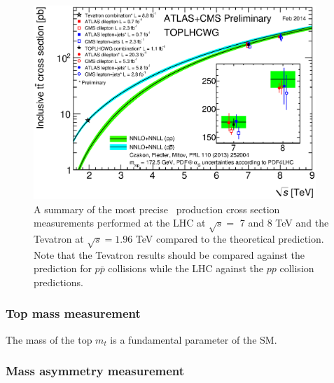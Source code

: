 \begin{figure}[htbp]
  \centering
  \includegraphics[width=0.95\textwidth]{PartTopQuark/Plots/tt_xsec_vsroots.eps}
  \caption{A summary of the most precise \ttbar\ production cross section measurements performed at the LHC at $\sqrt{s}=$ 7 and 8 TeV and the Tevatron at $\sqrt{s}=1.96$ TeV compared to the theoretical prediction. Note that the Tevatron results should be compared against the prediction for $p\bar{p}$ collisions while the LHC against the $pp$ collision predictions.}
  \label{fig:TopQuarkPairProductionComparison}
\end{figure}

\subsubsection{Top mass measurement}

The mass of the top $m_{t}$ is a fundamental parameter of the SM.
%

\subsubsection{Mass asymmetry measurement}

